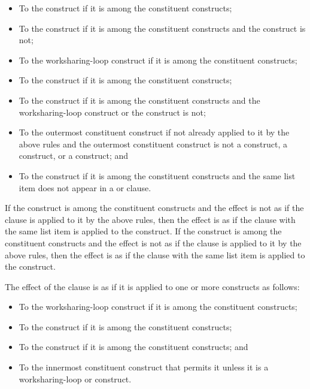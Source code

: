 \begin{itemize}
\item To the  construct if it is among the constituent constructs;
\item To the  construct if it is among the constituent constructs and 
      the  construct is not;
\item To the worksharing-loop construct if it is among the constituent constructs;
\item To the  construct if it is among the constituent constructs;
\item To the  construct if it is among the constituent constructs 
      and the worksharing-loop construct or the  construct is not;
\item To the outermost constituent construct if not already applied to it by the 
      above rules and the outermost constituent construct is not a  
      construct, a  construct, or a  construct; and
\item To the  construct if it is among the constituent
      constructs and the same list item does not appear in a  
      or  clause.
\end{itemize}

If the  construct is among the constituent constructs and the
effect is not as if the  clause is applied to it by the
above rules, then the effect is as if the  clause with the same
list item is applied to the  construct. If the  
construct is among the constituent constructs and the effect is not as if the 
 clause is applied to it by the above rules, then the effect 
is as if the  clause with the same list item is applied to the 
 construct.

The effect of the  clause is as if it is applied to one or 
more constructs as follows: 

\begin{itemize}
\item To the worksharing-loop construct if it is among the constituent constructs;
\item To the  construct if it is among the constituent constructs;
\item To the  construct if it is among the constituent constructs; and
\item To the innermost constituent construct that permits it unless it is a
      worksharing-loop or  construct.
\end{itemize}

